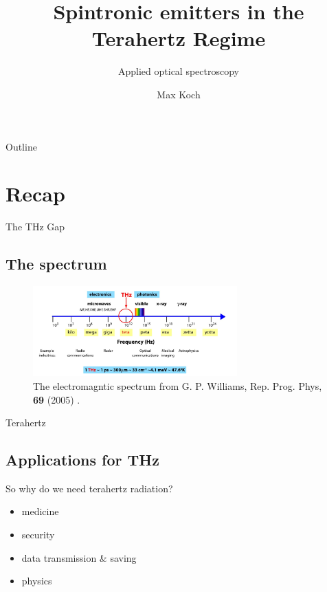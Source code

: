 \documentclass[aspectratio=1610, 9pt]{beamer}
\title{Spintronic emitters in the Terahertz Regime}
\subtitle{Applied optical spectroscopy}
\author[M.~Koch]{Max Koch}
\institute[]{TU Dortmund \\  Fakultät Physik}
\begin{document}
\maketitle

\begin{frame}{Outline}
  \tableofcontents
\end{frame}


\section{Recap}

\begin{frame}{The THz Gap}
  \subsection{The spectrum}
  \begin{center}
    \begin{figure}
      \includegraphics[width=0.7\textwidth]{images/spectrum.png}
      \caption{\textcolor{tugreen}{The electromagntic spectrum} from G. P. Williams, Rep. Prog. Phys, \textbf{69} (2005) .}
      \nocite{spectrum_pic}
    \end{figure}
  \end{center}
\end{frame}


\begin{frame}{Terahertz}
  \subsection{Applications for THz}
  \begin{center}
    \begin{minipage}[c]{0.5\linewidth}
      So why do we need terahertz radiation?
      \vspace{0.2in}
      \begin{itemize}
        \item medicine \nocite{THzgap_applications}
        \vspace{0.1in}
        \item security \nocite{thz_explosive_detec}
        \vspace{0.1in}
        \item data transmission \& saving \nocite{communication,datasaving}
        \vspace{0.1in}
        \item physics \nocite{wiki_book}
      \end{itemize}
    \end{minipage}
\end{center}
\end{frame}
\end{document}
